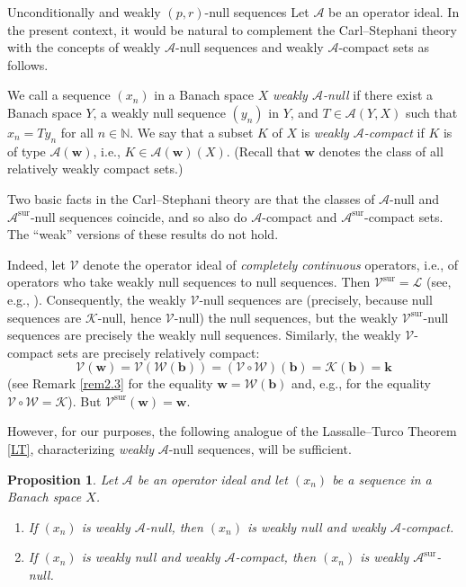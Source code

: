 \documentclass[a4paper,11pt]{amsart}
\newtheorem{prop}{Proposition}[section]
\theoremstyle{definition}
\theoremstyle{definition}
\theoremstyle{definition}
\begin{document}
\begin{section}{Unconditionally and weakly ${{(p,r)}}$-null sequences}
Let ${{\mathcal A}}$ be an operator ideal. In the present context, it would be natural to complement the Carl--Stephani theory with the concepts of weakly ${{\mathcal A}}$-null sequences and weakly ${{\mathcal A}}$-compact sets as follows. 

We call a sequence $(x_n)$ in a Banach space $X$ \emph{weakly ${{\mathcal A}}$-null} if there exist a Banach space $Y$, a weakly null sequence $(y_n)$ in $Y$, and $T\in{{\mathcal A}}(Y, X)$ such that $x_n =T y_n$ for all $n \in {{\mathbb N}}$. We say that a subset $K$ of $X$ is \emph{weakly ${{\mathcal A}}$-compact} if $K$ is of type ${{\mathcal A}}({\boldsymbol{w}})$, i.e., $K \in {{\mathcal A}}({\boldsymbol{w}})(X)$. (Recall that ${\boldsymbol{w}}$ denotes the class of all relatively weakly compact sets.)

Two basic facts in the Carl--Stephani theory \cite{CS} are that the classes of ${{\mathcal A}}$-null and ${{\mathcal A}}^\mathrm{sur}$-null sequences coincide, and so also do ${{\mathcal A}}$-compact and ${{\mathcal A}}^\mathrm{sur}$-compact sets. The ``weak'' versions of these results do not hold. 

Indeed, let ${{\mathcal V}}$ denote the operator ideal of \emph{completely continuous} operators, i.e., of operators who take weakly null sequences to null sequences. Then ${{\mathcal V}} ^\mathrm{sur}={{\mathcal L}}$ (see, e.g., \cite[4.7.13]{P}). Consequently, the weakly ${{\mathcal V}}$-null sequences are (precisely, because null sequences are ${{\mathcal K}}$-null, hence ${{\mathcal V}}$-null) the null sequences, but the weakly ${{\mathcal V}}^\mathrm{sur}$-null sequences are precisely the weakly null sequences. Similarly, the weakly ${{\mathcal V}}$-compact sets are precisely relatively compact:
\[
{{\mathcal V}}({\boldsymbol{w}})={{\mathcal V}} ( {{\mathcal W}} ( {\boldsymbol{b}}))= ({{\mathcal V}} \circ {{\mathcal W}} )( {\boldsymbol{b}}) = {{\mathcal K}}({\boldsymbol{b}})= {\boldsymbol{k}} 
\]
(see Remark \ref{rem2.3} for the equality ${\boldsymbol{w}}= {{\mathcal W}}({\boldsymbol{b}})$ and, e.g., \cite[3.1.3]{P} for the equality ${{\mathcal V}}\circ {{\mathcal W}}= {{\mathcal K}}$). But ${{\mathcal V}} ^\mathrm{sur}({\boldsymbol{w}})= {\boldsymbol{w}}$.

However, for our purposes, the following analogue of the Lassalle--Turco Theorem \ref{LT}, characterizing \emph{weakly} ${{\mathcal A}}$-null sequences, will be sufficient.

\begin{prop}\label{prop4.4}
Let ${{\mathcal A}}$ be an operator ideal and let $(x_n)$ be a sequence in a Banach space $X$.
\begin{enumerate}
\item If $(x_n)$ is weakly ${{\mathcal A}}$-null, then $(x_n)$ is weakly null and weakly ${{\mathcal A}}$-compact.
\item If $(x_n)$ is weakly null and weakly ${{\mathcal A}}$-compact, then $(x_n)$ is weakly ${{\mathcal A}}^\mathrm{sur}$-null.
\end{enumerate}


\end{prop}
\end{section}
\end{document}

